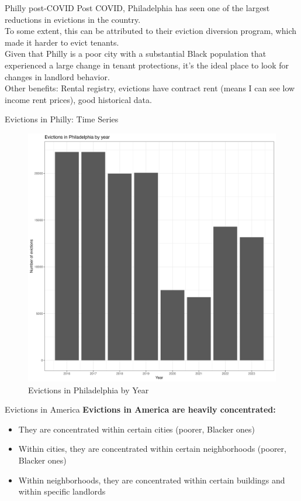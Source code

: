 \documentclass[10pt, xcolor=dvipsnames]{beamer}
\begin{document}
\begin{frame}{Philly post-COVID}
Post COVID, Philadelphia has seen one of the largest reductions in evictions in the country. \\
\vspace{0.5cm}
To some extent, this can be attributed to their eviction diversion program, which made it harder to evict tenants. \\
\vspace{0.5cm}
Given that Philly is a poor city with a substantial Black population that experienced a large change in tenant protections, it's the ideal place to look for changes in landlord behavior. \\
\vspace{0.5cm}
Other benefits: Rental registry, evictions have contract rent (means I can see low income rent prices), good historical data.
    
\end{frame}

\begin{frame}{Evictions in Philly: Time Series}
    \begin{figure}
    \centering
    \includegraphics[width=0.5\linewidth]{figs/evict_by_year.png}
    \caption{Evictions in Philadelphia by Year}
    \label{fig:philly-ts}
\end{figure}
\end{frame}


\begin{frame}{Evictions in America}
\textbf{Evictions in America are heavily concentrated:}
\begin{itemize}
    \item They are concentrated within certain cities (poorer, Blacker ones)
    \item Within cities, they are concentrated within certain neighborhoods (poorer, Blacker ones)
    \item Within neighborhoods, they are concentrated within certain buildings and within specific landlords 
\end{itemize} 

    
\end{frame}
\end{document}
